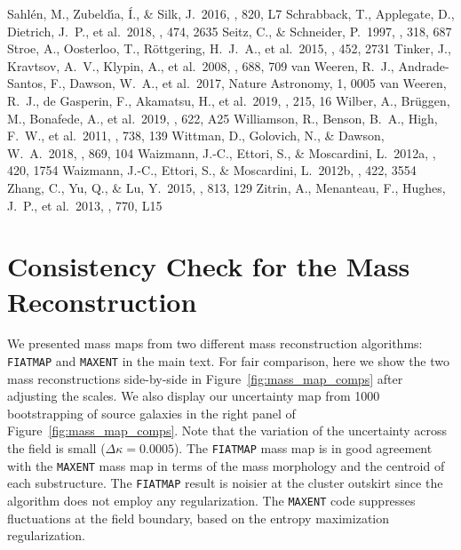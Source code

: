 \documentclass[twocolumn]{aastex631}
\begin{document}
\begin{thebibliography}{}
 Sahl{\'e}n, M., Zubeld{\'\i}a, {\'I}., \& Silk, J.\ 2016, \apjl, 820, L7
 Schrabback, T., Applegate, D., Dietrich, J.~P., et al.\ 2018, \mnras, 474, 2635
 Seitz, C., \& Schneider, P.\ 1997, \aap, 318, 687
 Stroe, A., Oosterloo, T., R{\"o}ttgering, H.~J.~A., et al.\ 2015, \mnras, 452, 2731
 Tinker, J., Kravtsov, A.~V., Klypin, A., et al.\ 2008, \apj, 688, 709
 van Weeren, R.~J., Andrade-Santos, F., Dawson, W.~A., et al.\ 2017, Nature Astronomy, 1, 0005
 van Weeren, R.~J., de Gasperin, F., Akamatsu, H., et al.\ 2019, \ssr, 215, 16
 Wilber, A., Br{\"u}ggen, M., Bonafede, A., et al.\ 2019, \aap, 622, A25
 Williamson, R., Benson, B.~A., High, F.~W., et al.\ 2011, \apj, 738, 139
 Wittman, D., Golovich, N., \& Dawson, W.~A.\ 2018, \apj, 869, 104
 Waizmann, J.-C., Ettori, S., \& Moscardini, L.\ 2012a, \mnras, 420, 1754
 Waizmann, J.-C., Ettori, S., \& Moscardini, L.\ 2012b, \mnras, 422, 3554
 Zhang, C., Yu, Q., \& Lu, Y.\ 2015, \apj, 813, 129
 Zitrin, A., Menanteau, F., Hughes, J.~P., et al.\ 2013, \apjl, 770, L15


\end{thebibliography}


\appendix

\section{Consistency Check for the Mass Reconstruction} \label{mass_map_comparison}
We presented mass maps from two different mass reconstruction algorithms: {\tt FIATMAP} \citep{FIATMAP} and {\tt MAXENT} \citep{Jee2007b} in the main text. For fair comparison, here we show the two mass reconstructions side-by-side in Figure~\ref{fig:mass_map_comps} after adjusting the scales. 
We also display our uncertainty map from 1000 bootstrapping of source galaxies in the right panel of Figure~\ref{fig:mass_map_comps}. Note that the variation of the uncertainty across the field is small ($\Delta \kappa = 0.0005$). 
The {\tt FIATMAP} mass map is in good agreement with the {\tt MAXENT} mass map in terms of the mass morphology and the centroid of each substructure.
The {\tt FIATMAP} result is noisier at the cluster outskirt since the algorithm does not employ any regularization. The {\tt MAXENT} code suppresses fluctuations at the field boundary, based on the entropy maximization regularization. 
\end{document}
